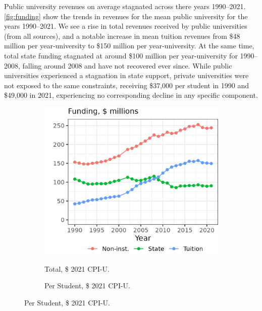 Public university revenues on average stagnated across there years 1990--2021.
\autoref{fig:funding} show the trends in revenues for the mean public university for the years 1990--2021.
We see a rise in total revenues received by public universities (from all sources), and a notable increase in mean tuition revenues from \$48 million per year-university to \$150 million per year-university.
At the same time, total state funding stagnated at around \$100 million per year-university for 1990--2008, falling around 2008 and have not recovered ever since.
While public universities experienced a stagnation in state support, private universities were not exposed to the same constraints, receiving \$37,000 per student in 1990 and \$49,000 in 2021, experiencing no corresponding decline in any specific component.

\begin{figure}[!htbp]
    \centering
    \singlespacing
    \caption{Mean Total Funding among Public Universities, by Year.}
    \begin{subfigure}[b]{0.495\textwidth}
        \centering
        \caption{Total, \$ 2021 CPI-U.}
        \includegraphics[width=\textwidth]{figures/mean-funding-total.png}
        \label{fig:mean-funding-total}
    \end{subfigure}
    \begin{subfigure}[b]{0.495\textwidth}
        \centering
        \caption{Per Student, \$ 2021 CPI-U.}

\end{subfigure}
\end{figure}

